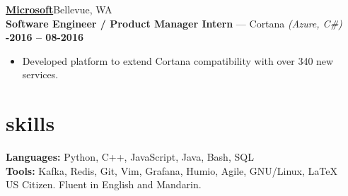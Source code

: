 \documentclass[margin,10pt]{res}
\begin{document}
\begin{resume}
    \href{https://careers.microsoft.com/professionals/us/en/c-engineering}{\textbf{\large {}  Microsoft}}\hfill Bellevue, WA\\
    \textbf{Software Engineer / Product Manager Intern} --- Cortana
    \textit{(Azure, C\#)}\hfill
    \textsc{\bfseries{}-2016 -- 08-2016}
    \vspace{0.5em}
    \begin{itemize}
        \item Developed platform to extend Cortana compatibility with over 340 new services.
    \end{itemize}

\vspace{5pt}

\section{\sc \lsstyle skills}
    \textbf{Languages:}
    Python, C++, JavaScript, Java, Bash, SQL\\
    \textbf{Tools:} Kafka, Redis, Git, Vim, Grafana, Humio, Agile, GNU/Linux, \LaTeX\\
    US Citizen. Fluent in English and Mandarin.
\end{resume}

\vspace{5pt}
\end{document}

